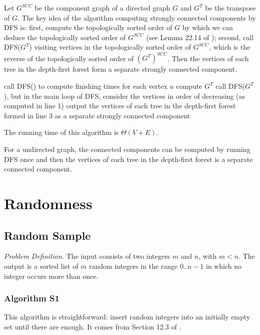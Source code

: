 \documentclass[12pt]{article}
\begin{document}
Let $G^{SCC}$ be the component graph of a directed graph $G$ and $G^T$ be
the transpose of $G$.  The key idea of the algorithm computing strongly
connected components by DFS is: first, compute the topologically sorted
order of $G$ by which we can deduce the topologically sorted order of
$G^{SCC}$ (see Lemma 22.14 of \cite{clrs2}); second, call DFS($G^T$) visiting
vertices in the topologically sorted order of $G^{SCC}$, which is the
reverse of the topologically sorted order of $(G^T)^{SCC}$. Then the
vertices of each tree in the depth-first forest form a separate strongly
connected component.

\begin{codebox}
\li call DFS() to compute finishing times  for each vertex
    $u$
\li compute $G^T$
\li call DFS($G^T$), but in the main loop of DFS, consider the vertices 
    \Indentmore
\zi in order of decreasing  (as computed in line 1)
    \End
\li output the vertices of each tree in the depth-first forest formed in
    \Indentmore
\zi line 3 as a separate strongly connected component
\end{codebox}

The running time of this algorithm is $\Theta(V+E)$.

For a undirected graph, the connected components can be computed by running
DFS once and then the vertices of each tree in the depth-first forest is a
separate connected component.


\section{Randomness}

\subsection{Random Sample}

\emph{Problem Definition.}
    The input consists of two integers $m$ and $n$, with $m < n$. The
    output is a sorted list of $m$ random integers in the range $0..n-1$ in
    which no integer occurs more than once.

\subsubsection{Algorithm S1}\label{algoset}

This algorithm is straightforward: insert random integers into an initially
empty set until there are enough.  It comes from Section 12.3 of
\cite{bently00}.
\end{document}
